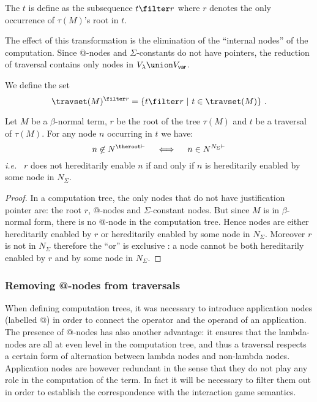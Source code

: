 \begin{definition}
The  $t$ is define as the subsequence $t\filter r$ where $r$ denotes the only occurrence of $\tau(M)$'s root in $t$.
\end{definition}
The effect of this transformation is the elimination of the
``internal nodes'' of the computation. Since @-nodes and
$\Sigma$-constants do not have pointers, the reduction of traversal
contains only nodes in $V_\lambda \union V_{\sf var}$.

We define the set
$$\travset(M)^{\filter r} = \{ t  \filter r \ | \  t  \in \travset(M) \} \ . $$


\begin{lemma}
\label{lem:betaeta_trav}
Let $M$ be a $\beta$-normal term, $r$ be the root of the tree $\tau(M)$ and
$t$ be a traversal of $\tau(M)$.
For any node $n$ occurring in $t$ we have:
$$ n \not\in N^{\theroot\vdash} \quad \iff \quad n \in N^{N_{\Sigma}\vdash}$$
{\it i.e.}~ $r$ does not hereditarily enable $n$ if and only if $n$ is
hereditarily enabled by some node in $N_\Sigma$.
\end{lemma}
\begin{proof}
 In a computation tree, the only nodes that do not have justification pointer are:
the root $r$, @-nodes and $\Sigma$-constant nodes. But since $M$ is
in $\beta$-normal form, there is no @-node in the computation tree.
Hence nodes are either hereditarily enabled by $r$ or hereditarily
enabled by some node in $N_\Sigma$. Moreover $r$ is not in $N_\Sigma$
therefore the ``or'' is exclusive : a node cannot be both hereditarily
enabled by $r$ and by some node in $N_\Sigma$.
\end{proof}




\subsubsection{Removing @-nodes from traversals}

When defining computation trees, it was necessary to introduce
application nodes (labelled @) in order to connect the operator and
the operand of an application. The presence of @-nodes has also
another advantage: it ensures that the lambda-nodes are all at even
level in the computation tree, and thus a traversal respects a
certain form of alternation between lambda nodes and non-lambda
nodes. Application nodes are however redundant in the sense that
they do not play any role in the computation of the term. In fact it
will be necessary to filter them out in order to establish the
correspondence with the interaction game semantics.

